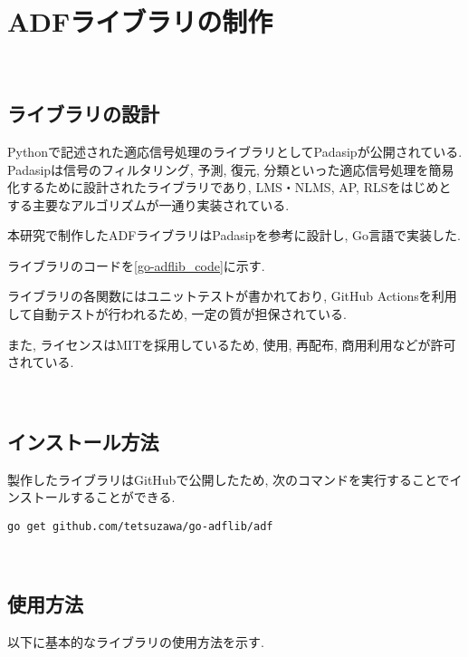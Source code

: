 \section{ADFライブラリの制作}\label{create-adflib}

\
\subsection{ライブラリの設計}\label{design-adf}

Pythonで記述された適応信号処理のライブラリとしてPadasip\cite{padasip}が公開されている. Padasipは信号のフィルタリング, 予測, 復元, 分類といった適応信号処理を簡易化するために設計されたライブラリであり, LMS・NLMS, AP, RLSをはじめとする主要なアルゴリズムが一通り実装されている. 

本研究で制作したADFライブラリはPadasipを参考に設計し, Go言語で実装した. 

ライブラリのコードを\ref{go-adflib_code}に示す. 

ライブラリの各関数にはユニットテストが書かれており, GitHub
Actionsを利用して自動テストが行われるため, 一定の質が担保されている. 

また, ライセンスはMITを採用しているため, 使用, 再配布, 商用利用などが許可されている. %

\
\subsection{インストール方法}\label{how-to-install}

製作したライブラリはGitHub\cite{go-adflib:online}で公開したため, 次のコマンドを実行することでインストールすることができる. 

\texttt{go\ get\ github.com/tetsuzawa/go-adflib/adf}

\
\subsection{使用方法}\label{how-to-use}

以下に基本的なライブラリの使用方法を示す. 

